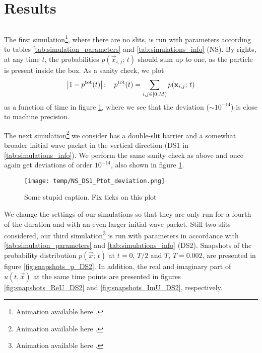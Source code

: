 \section{Results}\label{sec:results}




\subsection{}

    The first simulation\footnote{Animation available here .}, where there are no slits, is run with parameters according to tables \ref{tab:simulation_parameters} and \ref{tab:simulations_info} (NS). By rights, at any time $t$, the probabilities $p(\vec{x}_{i,j}; \, t)$ should sum up to one, as the particle is present inside the box. As a sanity check, we plot 
    \begin{equation}\label{eq:total_probability_deviation}
        \abs{1- p^\mathrm{tot}(t)}\,; \quad p^\mathrm{tot}(t) = \sum_{i,j\in [0, M)} p(\mathbf{x}_{i,j};\, t)
    \end{equation}
    as a function of time in figure \ref{fig:ptot_deviation_NS_DS1}, where we see that the deviation ($\sim 10^{-14}$) is close to machine precision.

    The next simulation\footnote{Animation available here .} we consider has a double-slit barrier and a somewhat broader initial wave packet in the vertical direction (DS1 in \ref{tab:simulations_info}). We perform the same sanity check as above and once again get deviations of order $ 10^{-14}$, also shown in figure \ref{fig:ptot_deviation_NS_DS1}.

    \begin{figure}[ht!]
        \centering
        \texttt{[image: temp/NS\_DS1\_Ptot\_deviation.png]}
        \caption{Some stupid caption. Fix ticks on this plot}
        \label{fig:ptot_deviation_NS_DS1}
    \end{figure}

    
    We change the settings of our simulations so that they are only run for a fourth of the duration and with an even larger initial wave packet. Still two slits considered, our third simulation\footnote{Animation available here .} is run with parameters in accordance with \ref{tab:simulation_parameters} and \ref{tab:simulations_info} (DS2). Snapshots of the probability distribution $p(\vec{x};\, t)$ at $t=0$, $T/2$ and $T$, $T=0.002$, are presented in figure \ref{fig:snapshots_p_DS2}.  In addition, the real and imaginary part of $u(t, \vec{x})$ at the same time points are presented in figures \ref{fig:snapshots_ReU_DS2} and \ref{fig:snapshots_ImU_DS2}, respectively.



